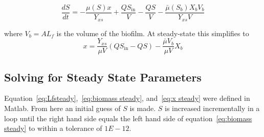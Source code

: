 \documentclass[letterpaper, twoside]{article}
\numberwithin{equation}{section}
\begin{document}
\begin{equation}
  \frac{dS}{dt} = -\frac{\mu(S) x }{Y_{xs}} + \frac{Q S_{\mathrm{in}}}{V} - \frac{Q S}{V} -\frac{\bar\mu(S_b) X_b V_b}{Y_{xs}{V}}
\end{equation}

where $V_b=A L_f$ is the volume of the biofilm.  At steady-state this simplifies to 
\begin{equation}
 \label{eq:x steady}
   x = \frac{Y_{xs}}{\mu V}\left(Q S_{\mathrm{in}} - Q S\right) -\frac{\bar{\mu} V_b}{\mu V}{X_b}
\end{equation}

\subsection{Solving for Steady State Parameters}
Equation~\ref{eq:Lfsteady},~\ref{eq:biomass steady}, and~\ref{eq:x steady} were defined in Matlab. From here an initial guess of $S$ is made. $S$ is increased incrementally in a loop until the right hand side equals the left hand side of equation~\ref{eq:biomass steady} to within a tolerance of $1E-12$.
\end{document}
